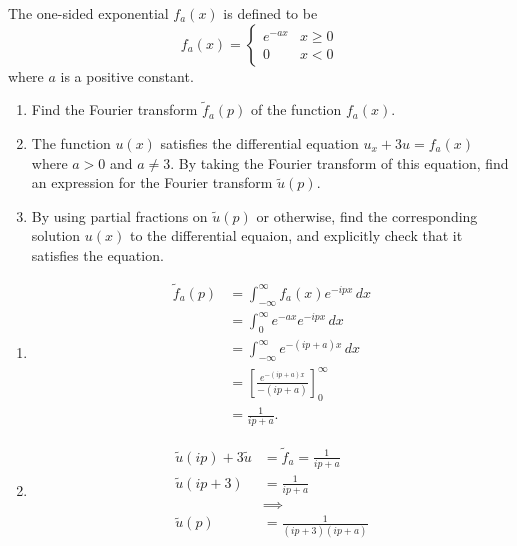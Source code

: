 \documentclass[10pt, a4paper]{article}
\begin{document}
\begin{problem}[Resit $2024$]
    The one-sided exponential $f_a(x)$ is defined to be
    \[
    f_a(x) = \begin{cases}
        e ^ {-ax} & x \geq 0 \\
        0 & x < 0
    \end{cases}
    \]
    where $a$ is a positive constant.

    \begin{enumerate}[label = (\alph*)]
        \item Find the Fourier transform $\tilde{f}_a(p)$ of the function $f_a(x)$.

        \item The function $u(x)$ satisfies the differential equation $u_x + 3u = f_a(x)$ where $a > 0$ and $a \neq 3$.
        By taking the Fourier transform of this equation,
        find an expression for the Fourier transform $\tilde{u}(p)$.

        \item By using partial fractions on $\tilde{u}(p)$ or otherwise,
        find the corresponding solution $u(x)$ to the differential equaion,
        and explicitly check that it satisfies the equation.
    \end{enumerate}

    \begin{solution}
        \begin{enumerate}[label = (\alph*)]
            \item
            \begin{align*}
                \tilde{f}_a(p) &= \int_{-\infty}^{\infty}f_a(x)e ^ {-ipx}\,dx \\
                &= \int_{0}^{\infty}e ^ {-ax}e ^ {-ipx}\,dx \\
                &= \int_{-\infty}^{\infty}e ^ {-(ip + a)x}\,dx \\
                &= \left[\frac{e ^ {-(ip + a)x}}{-(ip + a)}\right]_{0}^{\infty} \\
                &= \frac{1}{ip + a}.
            \end{align*}

            \item
            \begin{align*}
                \tilde{u}(ip) + 3\tilde{u} &= \tilde{f}_a = \frac{1}{ip + a} \\
                \tilde{u}(ip + 3) &= \frac{1}{ip + a} \\
                &\implies \\
                \tilde{u}(p) &= \frac{1}{(ip + 3)(ip + a)}
            \end{align*}


\end{enumerate}
\end{solution}
\end{problem}
\end{document}
